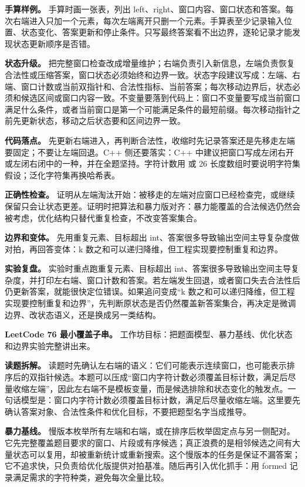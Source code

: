\textbf{手算样例。} 手算时画一张表，列出 left、right、窗口内容、窗口状态和答案。每次右端进入只加一个元素，每次左端离开只删一个元素。手算表至少记录输入位置、状态变化、答案更新和停止条件。只写最终答案看不出边界，逐轮记录才能发现状态更新顺序是否错。

\textbf{状态升级。} 把完整窗口检查改成增量维护；右端负责引入新信息，左端负责恢复合法性或压缩答案，窗口状态必须始终和边界一致。状态字段建议写成：左端、右端、窗口计数或当前双指针和、合法性指标、当前答案；每次移动边界后，状态必须和候选区间或窗口内容一致。不变量要落到代码上：窗口不变量要写成当前窗口满足什么条件，或者当前窗口是第一个可能满足条件的最短前缀。每次移动指针之前先更新状态，移动之后状态要和区间边界一致。

\textbf{代码落点。} 先更新右端进入，再判断合法性，收缩时先记录答案还是先移走左端要固定；不要让左端回退。C++ 侧还要落实：C++ 中建议把窗口写成左闭右开或左闭右闭中的一种，并在全题坚持。字符计数用  或 26 长度数组时要说明字符集假设；泛化字符集再换哈希表。

\textbf{正确性检查。} 证明从左端淘汰开始：被移走的左端对应窗口已经检查完，或继续保留只会让状态更差。证明时把算法和暴力版对齐：暴力能覆盖的合法候选仍然会被考虑，优化结构只替代重复检查，不改变答案集合。

\textbf{边界和变体。} 先用重复元素、目标超出 int、答案很多导致输出空间主导复杂度做对拍，再回答变体：k 数之和可以递归降维，但工程实现要控制重复和边界。

\textbf{实验复盘。} 实验时重点跑重复元素、目标超出 int、答案很多导致输出空间主导复杂度，并打印左右端、窗口计数和答案。若左端发生回退，或者窗口失去合法性后仍更新答案，就能很快定位错误。如果追问变成“k 数之和可以递归降维，但工程实现要控制重复和边界”，先判断原状态是否仍然覆盖新答案集合，再决定是微调边界、改状态语义，还是换成另一类结构。

\noindent\textbf{LeetCode 76 最小覆盖子串。} 工作坊目标：把题面模型、暴力基线、优化状态和边界实验完整讲出来。

\textbf{读题拆解。} 读题时先确认左右端的语义：它们可能表示连续窗口，也可能表示排序后的双指针候选。本题可以压成“窗口内字符计数必须覆盖目标计数，满足后尽量收缩左端”，因此左右端不是模板变量，而是候选排除和状态变化的触发点。一句话模型是：窗口内字符计数必须覆盖目标计数，满足后尽量收缩左端。这里要先确认答案对象、合法性条件和优化目标，不要把题型名字当成推导。

\textbf{暴力基线。} 慢版本枚举所有左端和右端，或在排序后枚举固定点与另一侧配对。它先完整覆盖题目要求的窗口、片段或有序候选；真正浪费的是相邻候选之间有大量状态可以复用，却被重新统计或重新搜索。这个慢版本的任务是保证不漏答案；它不追求快，只负责给优化版提供对拍基准。随后再引入优化抓手：用 formed 记录满足需求的字符种类，避免每次全量比较。

